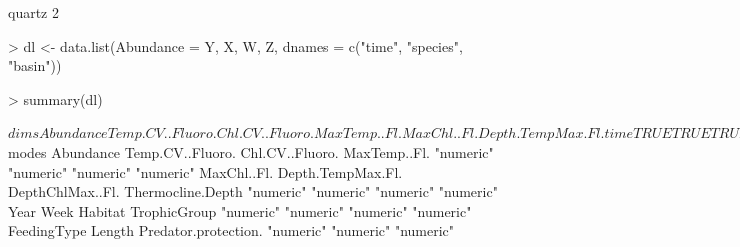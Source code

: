 \documentclass{article}
\numberwithin{exercise}{section}
\begin{document}
\begin{Schunk}
\begin{Soutput}
quartz 
     2 
\end{Soutput}
\end{Schunk}

\newpage


\begin{Schunk}
\begin{Sinput}
> dl <- data.list(Abundance = Y, X, W, Z, dnames = c("time", "species", "basin"))
\end{Sinput}
\end{Schunk}

\newpage

\begin{Schunk}
\begin{Sinput}
> summary(dl)
\end{Sinput}
\begin{Soutput}
$dims
        Abundance Temp.CV..Fluoro. Chl.CV..Fluoro. MaxTemp..Fl. MaxChl..Fl. Depth.TempMax.Fl.
time         TRUE             TRUE            TRUE         TRUE        TRUE              TRUE
species      TRUE            FALSE           FALSE        FALSE       FALSE             FALSE
basin        TRUE             TRUE            TRUE         TRUE        TRUE              TRUE
        DepthChlMax..Fl. Thermocline.Depth  Year  Week Habitat TrophicGroup FeedingType Length
time                TRUE              TRUE  TRUE  TRUE   FALSE        FALSE       FALSE  FALSE
species            FALSE             FALSE FALSE FALSE    TRUE         TRUE        TRUE   TRUE
basin               TRUE              TRUE FALSE FALSE   FALSE        FALSE       FALSE  FALSE
        Predator.protection.
time                   FALSE
species                 TRUE
basin                  FALSE

$modes
           Abundance     Temp.CV..Fluoro.      Chl.CV..Fluoro.         MaxTemp..Fl. 
           "numeric"            "numeric"            "numeric"            "numeric" 
         MaxChl..Fl.    Depth.TempMax.Fl.     DepthChlMax..Fl.    Thermocline.Depth 
           "numeric"            "numeric"            "numeric"            "numeric" 
                Year                 Week              Habitat         TrophicGroup 
           "numeric"            "numeric"            "numeric"            "numeric" 
         FeedingType               Length Predator.protection. 
           "numeric"            "numeric"            "numeric" 
\end{Soutput}
\end{Schunk}
\end{document}
